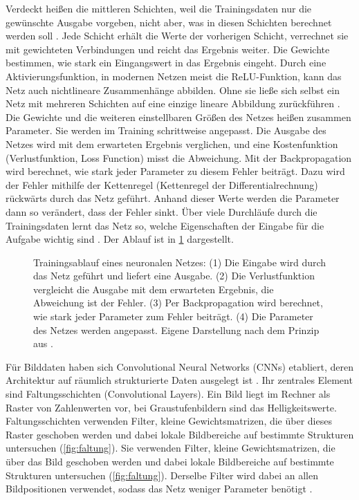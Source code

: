 \noindent Verdeckt heißen die mittleren Schichten, weil die Trainingsdaten nur die gewünschte Ausgabe vorgeben, nicht aber, was in diesen Schichten berechnet werden soll \cite{goodfellow2016deep}. Jede Schicht erhält die Werte der vorherigen Schicht, verrechnet sie mit gewichteten Verbindungen und reicht das Ergebnis weiter. Die Gewichte bestimmen, wie stark ein Eingangswert in das Ergebnis eingeht. Durch eine Aktivierungsfunktion, in modernen Netzen meist die ReLU-Funktion, kann das Netz auch nichtlineare Zusammenhänge abbilden. Ohne sie ließe sich selbst ein Netz mit mehreren Schichten auf eine einzige lineare Abbildung zurückführen \cite{goodfellow2016deep, lecun2015deep}. Die Gewichte und die weiteren einstellbaren Größen des Netzes heißen zusammen Parameter. Sie werden im Training schrittweise angepasst. Die Ausgabe des Netzes wird mit dem erwarteten Ergebnis verglichen, und eine Kostenfunktion (Verlustfunktion, Loss Function) misst die Abweichung. Mit der Backpropagation wird berechnet, wie stark jeder Parameter zu diesem Fehler beiträgt. Dazu wird der Fehler mithilfe der Kettenregel (Kettenregel der Differentialrechnung) rückwärts durch das Netz geführt. Anhand dieser Werte werden die Parameter dann so verändert, dass der Fehler sinkt. Über viele Durchläufe durch die Trainingsdaten lernt das Netz so, welche Eigenschaften der Eingabe für die Aufgabe wichtig sind \cite{goodfellow2016deep, lecun2015deep}. Der Ablauf ist in \cref{fig:nn-training} dargestellt.

\begin{figure}[H]
  \centering
  \resizebox{\linewidth}{!}{}
  \caption[Training eines neuronalen Netzes]{Trainingsablauf eines neuronalen Netzes: (1) Die Eingabe wird durch das Netz geführt und liefert eine Ausgabe. (2) Die Verlustfunktion vergleicht die Ausgabe mit dem erwarteten Ergebnis, die Abweichung ist der Fehler. (3) Per Backpropagation wird berechnet, wie stark jeder Parameter zum Fehler beiträgt. (4) Die Parameter des Netzes werden angepasst. Eigene Darstellung nach dem Prinzip aus \cite{goodfellow2016deep,lecun2015deep}.}
  \label{fig:nn-training}
\end{figure}

\noindent Für Bilddaten haben sich Convolutional Neural Networks (CNNs) etabliert, deren Architektur auf räumlich strukturierte Daten ausgelegt ist \cite{goodfellow2016deep, lecun2015deep}. Ihr zentrales Element sind Faltungsschichten (Convolutional Layers). Ein Bild liegt im Rechner als Raster von Zahlenwerten vor, bei Graustufenbildern sind das Helligkeitswerte. Faltungsschichten verwenden Filter, kleine Gewichtsmatrizen, die über dieses Raster geschoben werden und dabei lokale Bildbereiche auf bestimmte Strukturen untersuchen (\cref{fig:faltung}). Sie verwenden Filter, kleine Gewichtsmatrizen, die über das Bild geschoben werden und dabei lokale Bildbereiche auf bestimmte Strukturen untersuchen (\cref{fig:faltung}). Derselbe Filter wird dabei an allen Bildpositionen verwendet, sodass das Netz weniger Parameter benötigt \cite{goodfellow2016deep}. 

